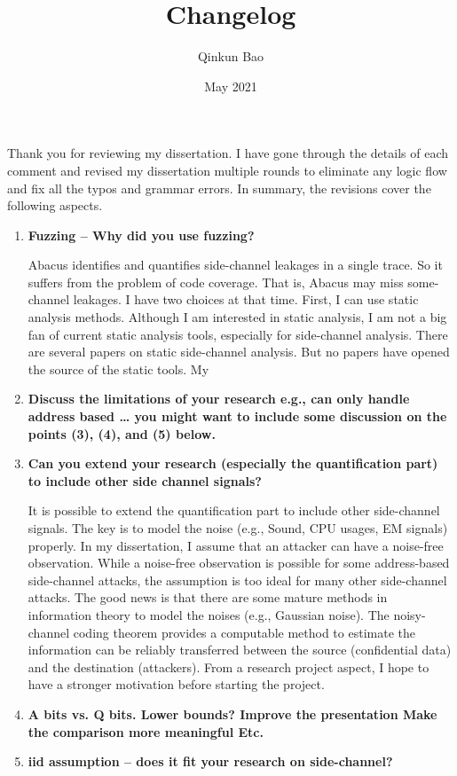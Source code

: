 \documentclass{article}
\title{Changelog}
\author{Qinkun Bao}
\date{May 2021}
\begin{document}
\maketitle
Thank you for reviewing my dissertation. I have gone through the details of each comment and revised my dissertation multiple rounds to eliminate any logic flow and fix all the typos and grammar errors. In summary, the revisions cover the following aspects.


\begin{enumerate}
\item \textbf{Fuzzing – Why did you use fuzzing?}

Abacus identifies and quantifies side-channel leakages in a single trace. So it suffers from the problem of code coverage.  That is, Abacus may miss some-channel leakages. I have two choices at that time. First, I can use static analysis methods. Although I am interested in static analysis, I am not a big fan of current static analysis tools, especially for side-channel analysis. There are several papers on static side-channel analysis. But no papers have opened the source of the static tools. My 

\item \textbf{Discuss the limitations of your research
e.g., can only handle address based …
you might want to include some discussion on the points (3), (4), and (5) below.}
\item \textbf{Can you extend your research (especially the quantification part) to include other side channel signals?}

It is possible to extend the quantification part to include other side-channel signals. The key is to model the noise (e.g., Sound, CPU usages, EM signals) properly. In my dissertation, I assume that an attacker can have a noise-free observation. While a noise-free observation is possible for some address-based side-channel attacks, the assumption is too ideal for many other side-channel attacks. The good news is that there are some mature methods in information theory to model the noises (e.g., Gaussian noise). The noisy-channel coding theorem provides a computable method to estimate the information can be reliably transferred between the source (confidential data) and the destination (attackers). From a research project aspect, I hope to have a stronger motivation before starting the project. 
\item \textbf{A bits vs. Q bits. Lower bounds?
       Improve the presentation
       Make the comparison more meaningful
       Etc.}
\item \textbf{iid assumption – does it fit your research on side-channel?}


\end{enumerate}
\end{document}

